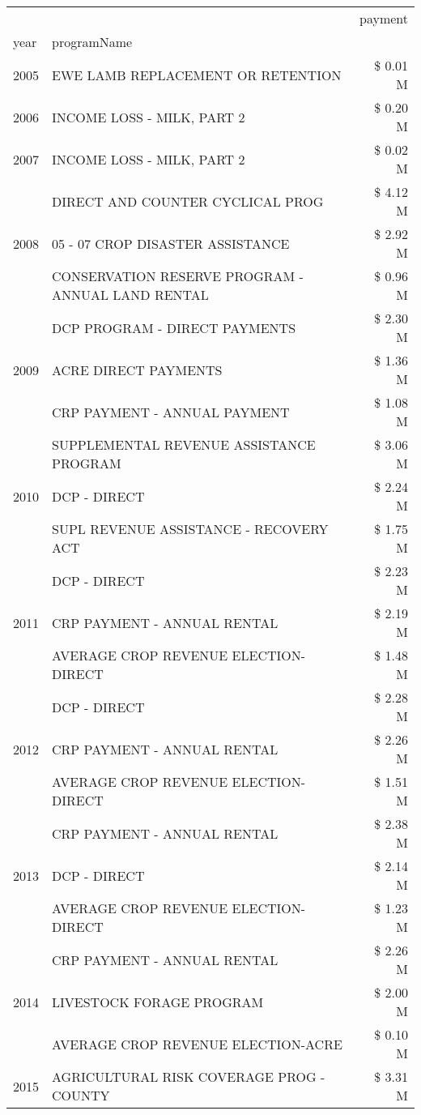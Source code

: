 \begin{tabular}{llr}
\toprule
 &  & payment \\
year & programName &  \\
\midrule
2005 & EWE LAMB REPLACEMENT OR RETENTION & \$ 0.01 M \\
\cline{1-3}
2006 & INCOME LOSS - MILK, PART 2 & \$ 0.20 M \\
\cline{1-3}
2007 & INCOME LOSS - MILK, PART 2 & \$ 0.02 M \\
\cline{1-3}
\multirow[t]{3}{*}{2008} & DIRECT AND COUNTER CYCLICAL PROG & \$ 4.12 M \\
 & 05 - 07 CROP DISASTER ASSISTANCE & \$ 2.92 M \\
 & CONSERVATION RESERVE PROGRAM - ANNUAL LAND RENTAL & \$ 0.96 M \\
\cline{1-3}
\multirow[t]{3}{*}{2009} & DCP PROGRAM - DIRECT PAYMENTS & \$ 2.30 M \\
 & ACRE DIRECT PAYMENTS & \$ 1.36 M \\
 & CRP PAYMENT - ANNUAL PAYMENT & \$ 1.08 M \\
\cline{1-3}
\multirow[t]{3}{*}{2010} & SUPPLEMENTAL REVENUE ASSISTANCE PROGRAM & \$ 3.06 M \\
 & DCP - DIRECT & \$ 2.24 M \\
 & SUPL REVENUE ASSISTANCE - RECOVERY ACT & \$ 1.75 M \\
\cline{1-3}
\multirow[t]{3}{*}{2011} & DCP - DIRECT & \$ 2.23 M \\
 & CRP PAYMENT - ANNUAL RENTAL & \$ 2.19 M \\
 & AVERAGE CROP REVENUE ELECTION-DIRECT & \$ 1.48 M \\
\cline{1-3}
\multirow[t]{3}{*}{2012} & DCP - DIRECT & \$ 2.28 M \\
 & CRP PAYMENT - ANNUAL RENTAL & \$ 2.26 M \\
 & AVERAGE CROP REVENUE ELECTION-DIRECT & \$ 1.51 M \\
\cline{1-3}
\multirow[t]{3}{*}{2013} & CRP PAYMENT - ANNUAL RENTAL & \$ 2.38 M \\
 & DCP - DIRECT & \$ 2.14 M \\
 & AVERAGE CROP REVENUE ELECTION-DIRECT & \$ 1.23 M \\
\cline{1-3}
\multirow[t]{3}{*}{2014} & CRP PAYMENT - ANNUAL RENTAL & \$ 2.26 M \\
 & LIVESTOCK FORAGE PROGRAM & \$ 2.00 M \\
 & AVERAGE CROP REVENUE ELECTION-ACRE & \$ 0.10 M \\
\cline{1-3}
\multirow[t]{3}{*}{2015} & AGRICULTURAL RISK COVERAGE PROG - COUNTY & \$ 3.31 M \\

\end{tabular}
